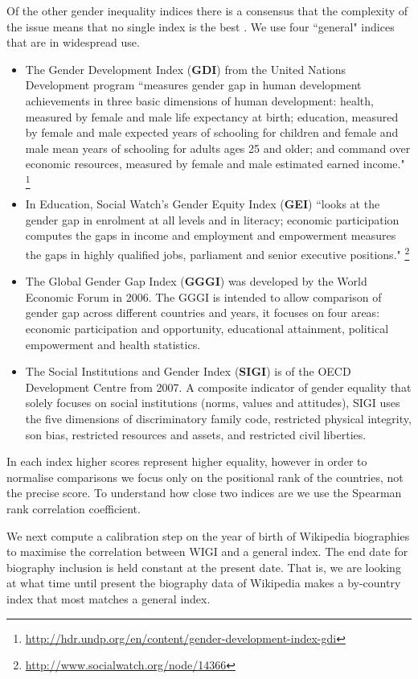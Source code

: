 \documentclass{sig-alternate}
\begin{document}
Of the other gender inequality indices there is a consensus that the complexity of the issue means that no single index is the best \cite{mills} \cite{hawken}. We use four ``general" indices that are in widespread use. 
 
\begin{itemize}
\item The Gender Development Index (\textbf{GDI}) from the United Nations Development program ``measures gender gap in human development achievements in three basic dimensions of human development: health, measured by female and male life expectancy at birth; education, measured by female and male expected years of schooling for children and female and male mean years of schooling for adults ages 25 and older; and command over economic resources, measured by female and male estimated earned income." \footnote{\url{http://hdr.undp.org/en/content/gender-development-index-gdi}}
\item In Education, Social Watch's Gender Equity Index (\textbf{GEI}) ``looks at the gender gap in enrolment at all levels and in literacy; economic participation computes the gaps in income and employment and empowerment measures the gaps in highly qualified jobs, parliament and senior executive positions." \footnote{\url{http://www.socialwatch.org/node/14366}}
\item The Global Gender Gap Index (\textbf{GGGI}) was developed by the World Economic Forum in 2006. The GGGI is intended to allow comparison of gender gap across different countries and years, it focuses on four areas:  economic participation and opportunity, educational attainment, political empowerment and health statistics.
\item The Social Institutions and Gender Index (\textbf{SIGI}) is of the OECD Development Centre from 2007. A composite indicator of gender equality that solely focuses on social institutions (norms, values and attitudes), SIGI uses the five dimensions of discriminatory family code, restricted physical integrity, son bias, restricted resources and assets, and restricted civil liberties.
\end{itemize}

In each index higher scores represent higher equality, however in order to normalise comparisons we focus only on the positional rank of the countries, not the precise score. To understand how close two indices are we use the Spearman rank correlation coefficient. 

We next compute a calibration step on the year of birth of Wikipedia biographies to maximise the correlation between WIGI and a general index. The end date for biography inclusion is held constant at the present date. That is, we are looking at what time until present the biography data of Wikipedia makes a by-country index that most matches a general index.
\end{document}
